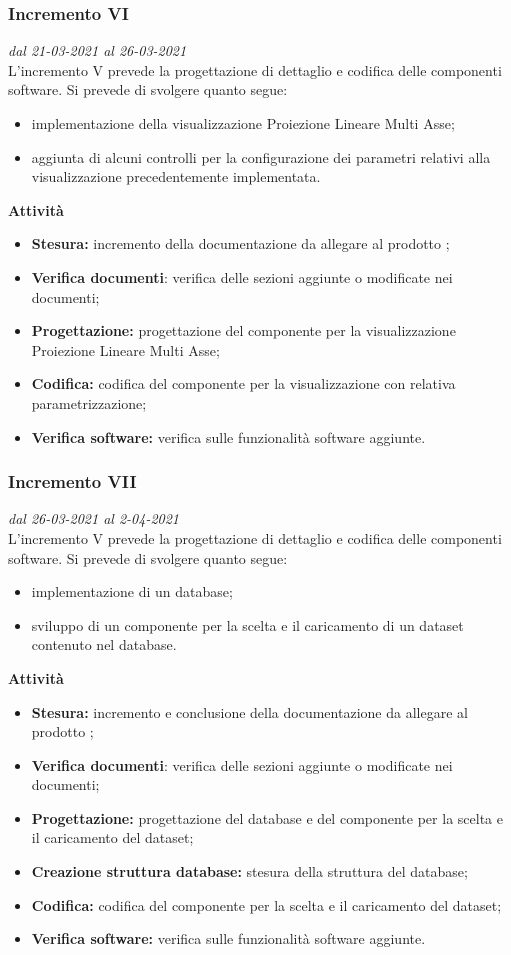 \subsubsection{Incremento VI}
\textit{dal 21-03-2021 al 26-03-2021}\\
L'incremento V prevede la progettazione di dettaglio e codifica delle componenti software. Si prevede di svolgere quanto segue:
\begin{itemize}
\item implementazione della visualizzazione Proiezione Lineare Multi Asse;
\item aggiunta di alcuni controlli per la configurazione dei parametri relativi alla visualizzazione precedentemente implementata.
\end{itemize}
\textbf{Attività}
\begin{itemize}
\item \textbf{Stesura:} incremento della documentazione da allegare al prodotto ;
\item \textbf{Verifica documenti}: verifica delle sezioni aggiunte o modificate nei documenti;
\item \textbf{Progettazione:} progettazione del componente per la visualizzazione Proiezione Lineare Multi Asse;
\item \textbf{Codifica:} codifica del componente per la visualizzazione con relativa parametrizzazione;
\item \textbf{Verifica software:} verifica sulle funzionalità software aggiunte.
\end{itemize}

\subsubsection{Incremento VII}
\textit{dal 26-03-2021 al 2-04-2021}\\
L'incremento V prevede la progettazione di dettaglio e codifica delle componenti software. Si prevede di svolgere quanto segue:
\begin{itemize}
\item implementazione di un database;
\item sviluppo di un componente per la scelta e il caricamento di un dataset contenuto nel database.
\end{itemize}
\textbf{Attività}
\begin{itemize}
\item \textbf{Stesura:} incremento e conclusione della documentazione da allegare al prodotto ;
\item \textbf{Verifica documenti}: verifica delle sezioni aggiunte o modificate nei documenti;
\item \textbf{Progettazione:} progettazione del database e del componente per la scelta e il caricamento del dataset;
\item \textbf{Creazione struttura database:} stesura della struttura del database;
\item \textbf{Codifica:} codifica del componente per la scelta e il caricamento del dataset;
\item \textbf{Verifica software:} verifica sulle funzionalità software aggiunte.
\end{itemize}

